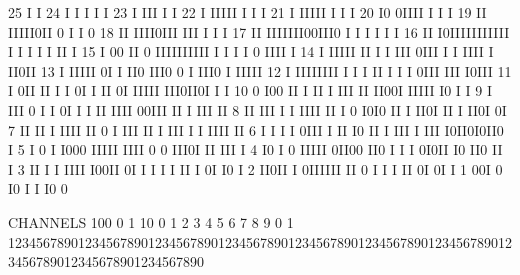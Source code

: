 \begin{Listing}
       25                                  I I
       24                                  I I I   I                                          I
       23                                  I III   I                                          I
       22                                  I IIIII I I                                        I
       21                                  I IIIII I I                                        I
       20                                 I0 0IIII I I                                        I
       19                             II  IIIII0II 0 I                               I        0
       18                             II  IIII0III III                               I     I  I
       17                             II IIIIIII00III0 I                 I         I I     I  I
       16                             II I0IIIIIIIIIII I                 I      I  I I    II  I
       15                          I  00 II 0 IIIIIIIIII                 I  I   I  I 0   IIII I
       14                        I IIIII II I I III 0III                 I  I   IIII I   II0II
       13                        I IIIII 0I I   II0 III0                 0  I   III0 I   IIIII
       12                        I IIIIIIII I     I I II            I    I  I   0III III I0III
       11                        I 0II  II        I I 0I            I    II 0I IIIII  III0II0I      I  I
       10                        0 I00  II        I   II            I   III II II00I  IIIII I0      I  I
        9                        I III  0             I I           0I  I I II IIII   00III II  I  III II
        8                       II III  I             I IIII        II  I 0 I0I0 II I II0I  II  I II0I 0I
        7                       II  II  I               IIII        II  0 I  III II I III    I  I IIII II
        6                     I I I     I               0III  I  II I0 II I  III    I III      I0II0I0II0 I
        5                     I 0 I                     I000  IIIII  IIII     0     0          III0I II III  I
        4                    I0 I 0                     IIIII 0II00  II0   I  I     I          0I0II I0 II0 II I
        3                    II I I                      IIII I00II   0I   I  I     I          I II   I  0I I0 I
        2                  II0II  I                         0IIIIII   II   0                   I I    I  II 0I 0I  I
        1                  00I 0                            I0             I                                I  I0  0
 
 CHANNELS 100   0                                                                                                  1   
           10   0        1         2         3         4         5         6         7         8         9         0   
            1   1234567890123456789012345678901234567890123456789012345678901234567890123456789012345678901234567890   
 

\end{Listing}
